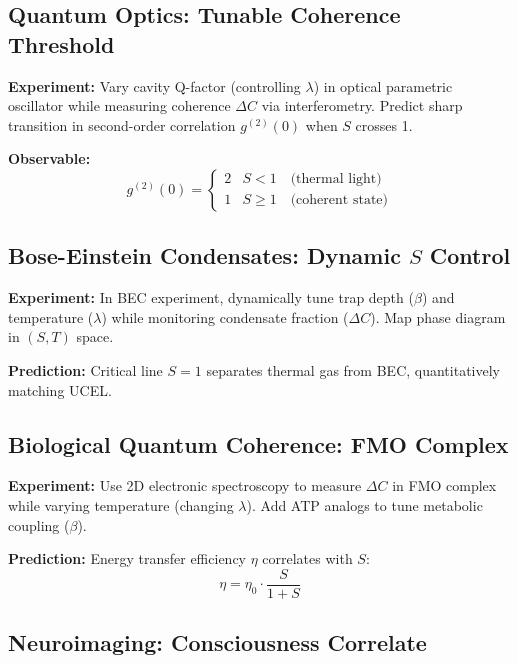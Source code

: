 \documentclass[12pt,a4paper]{article}
\begin{document}
\subsection{Quantum Optics: Tunable Coherence Threshold}

\textbf{Experiment:} Vary cavity Q-factor (controlling $\lambda$) in optical parametric oscillator while measuring coherence $\Delta C$ via interferometry. Predict sharp transition in second-order correlation $g^{(2)}(0)$ when $S$ crosses 1.

\textbf{Observable:}
\begin{equation}
g^{(2)}(0) = \begin{cases}
2 & S < 1 \quad \text{(thermal light)} \\
1 & S \geq 1 \quad \text{(coherent state)}
\end{cases}
\end{equation}

\subsection{Bose-Einstein Condensates: Dynamic $S$ Control}

\textbf{Experiment:} In BEC experiment, dynamically tune trap depth ($\beta$) and temperature ($\lambda$) while monitoring condensate fraction ($\Delta C$). Map phase diagram in $(S, T)$ space.

\textbf{Prediction:} Critical line $S = 1$ separates thermal gas from BEC, quantitatively matching UCEL.

\subsection{Biological Quantum Coherence: FMO Complex}

\textbf{Experiment:} Use 2D electronic spectroscopy \citep{engel2007} to measure $\Delta C$ in FMO complex while varying temperature (changing $\lambda$). Add ATP analogs to tune metabolic coupling ($\beta$).

\textbf{Prediction:} Energy transfer efficiency $\eta$ correlates with $S$:
\begin{equation}
\eta = \eta_0 \cdot \frac{S}{1 + S}
\label{eq:efficiency}
\end{equation}

\subsection{Neuroimaging: Consciousness Correlate}
\end{document}
